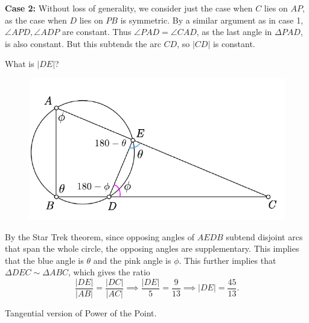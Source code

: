 \documentclass[twoside,10pt]{article}
\begin{document}
\textbf{Case 2:} Without loss of generality, we consider just the case when $C$ lies on $AP$, as the case when $D$ lies on $PB$ is symmetric. By a similar argument as in case 1, $\angle APD, \angle ADP$ are constant. Thus $\angle PAD = \angle CAD$, as the last angle in $\Delta PAD$, is also constant. But this subtends the arc $CD$, so $|CD|$ is constant.


\newpage

\begin{exer}[1.52]
What is $|DE|$?
\end{exer}

\begin{figure}[H]
	\centering
	\includegraphics[scale=0.8]{fig/52.pdf}
\end{figure}

By the Star Trek theorem, since opposing angles of $AEDB$ subtend disjoint arcs that span the whole circle, the opposing angles are supplementary. This implies that the blue angle is $\theta$ and the pink angle is $\phi$. This further implies that $\Delta DEC \sim \Delta ABC$, which gives the ratio
\[
\frac{|DE|}{|AB|} = \frac{|DC|}{|AC|} \implies \frac{|DE|}{5} = \frac{9}{13} \implies |DE| = \frac{45}{13} .
\] 

\newpage

\begin{exer}[1.53]
Tangential version of Power of the Point.
\end{exer}
\end{document}
